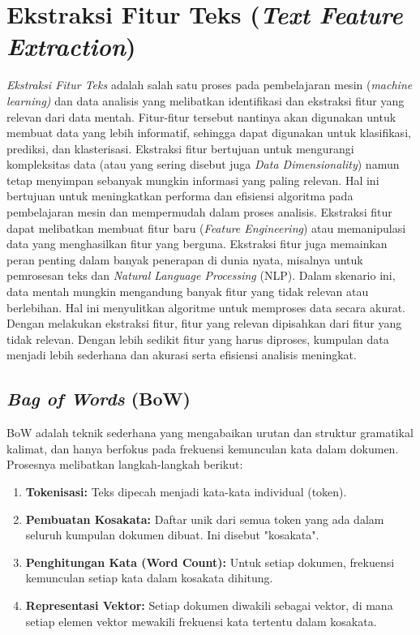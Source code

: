 \section{Ekstraksi Fitur Teks (\textit{Text Feature Extraction})}
\textit{Ekstraksi Fitur Teks} adalah salah satu proses pada pembelajaran mesin (\textit{machine learning)} dan data analisis yang melibatkan identifikasi dan ekstraksi fitur yang relevan dari data mentah. Fitur-fitur tersebut nantinya akan digunakan untuk membuat data yang lebih informatif, sehingga dapat digunakan untuk klasifikasi, prediksi, dan klasterisasi. Ekstraksi fitur bertujuan untuk mengurangi kompleksitas data (atau yang sering disebut juga \textit{Data Dimensionality}) namun tetap menyimpan sebanyak mungkin informasi yang paling relevan. Hal ini bertujuan untuk meningkatkan performa dan efisiensi algoritma pada pembelajaran mesin dan mempermudah dalam proses analisis. Ekstraksi fitur dapat melibatkan membuat fitur baru (\textit{Feature Engineering}) atau memanipulasi data yang menghasilkan fitur yang berguna.
Ekstraksi fitur juga memainkan peran penting dalam banyak penerapan di dunia nyata, misalnya untuk pemrosesan teks dan \textit{Natural Language Processing} (NLP). Dalam skenario ini, data mentah mungkin mengandung banyak fitur yang tidak relevan atau berlebihan. Hal ini menyulitkan algoritme untuk memproses data secara akurat. Dengan melakukan ekstraksi fitur, fitur yang relevan dipisahkan dari fitur yang tidak relevan. Dengan lebih sedikit fitur yang harus diproses, kumpulan data menjadi lebih sederhana dan akurasi serta efisiensi analisis meningkat.

\subsection{\textit{Bag of Words} (BoW)}

BoW adalah teknik sederhana yang mengabaikan urutan dan struktur gramatikal kalimat, dan hanya berfokus pada frekuensi kemunculan kata dalam dokumen. Prosesnya melibatkan langkah-langkah berikut:

\begin{enumerate}
    \item \textbf{Tokenisasi:} Teks dipecah menjadi kata-kata individual (token).
    \item \textbf{Pembuatan Kosakata:} Daftar unik dari semua token yang ada dalam seluruh kumpulan dokumen dibuat. Ini disebut "kosakata".
    \item \textbf{Penghitungan Kata (Word Count): } Untuk setiap dokumen, frekuensi kemunculan setiap kata dalam kosakata dihitung. 
    \item \textbf{Representasi Vektor:} Setiap dokumen diwakili sebagai vektor, di mana setiap elemen vektor mewakili frekuensi kata tertentu dalam kosakata.
\end{enumerate}


